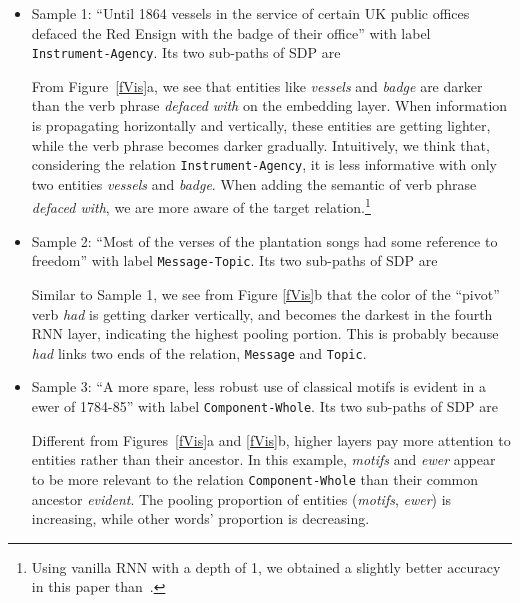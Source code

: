 \documentclass[11pt]{article}
\begin{document}
\bigskip
\begin{itemize}

\item Sample 1: ``Until 1864 vessels in the service of certain UK public offices defaced the Red Ensign with the badge of their office'' with label \verb|Instrument-Agency|.
    Its two sub-paths of SDP are
    From Figure~\ref{fVis}a, we see that entities like \textit{vessels} and \textit{badge}
    are darker than the verb phrase \textit{defaced with} on the embedding layer.
    When information is propagating horizontally and vertically, these entities are getting lighter, while the verb phrase becomes darker gradually.
    Intuitively, we think that, considering the relation \verb|Instrument-Agency|, it is less informative with only two entities \textit{vessels} and \textit{badge}.
    When adding the semantic of verb phrase \textit{defaced with}, we are more aware of the target relation.{\color{white}\footnote{ Using vanilla RNN with a depth of 1, we obtained a slightly better accuracy in this paper than~.}}

\item Sample 2: ``Most of the verses of the plantation songs had some reference to freedom'' with label \verb|Message-Topic|.
    Its two sub-paths of SDP are
    Similar to Sample 1, we see from Figure \ref{fVis}b that the color of the ``pivot'' verb \textit{had} is getting darker vertically, and becomes the darkest in the fourth RNN layer, indicating the highest pooling portion.
    This is probably because \textit{had} links two ends of the relation, \verb|Message| and \verb|Topic|.


\item Sample 3: ``A more spare, less robust use of classical motifs is evident in a ewer of 1784-85'' with label \verb|Component-Whole|.
    Its two sub-paths of SDP are
 Different from Figures~\ref{fVis}a and \ref{fVis}b, higher layers pay more attention to entities rather than their ancestor. In this example, \textit{motifs} and \textit{ewer} appear to be more relevant to the relation \verb|Component-|\verb|Whole| than their common ancestor \textit{evident}.
The pooling proportion of entities (\textit{motifs}, \textit{ewer}) is increasing, while other words' proportion is decreasing.

\end{itemize}
\end{document}
